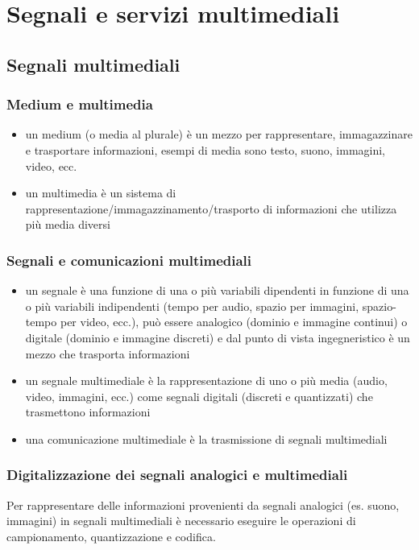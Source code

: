 \section{Segnali e servizi multimediali}
\subsection{Segnali multimediali}
\subsubsection*{Medium e multimedia}
\begin{itemize}
	\item un medium (o media al plurale) è un mezzo per rappresentare, immagazzinare e trasportare informazioni, esempi di
	media sono testo, suono, immagini, video, ecc.
	\item un multimedia è un sistema di rappresentazione/immagazzinamento/trasporto di informazioni che utilizza più media
	diversi
\end{itemize}

\subsubsection*{Segnali e comunicazioni multimediali}
\begin{itemize}
	\item un segnale è una funzione di una o più variabili dipendenti in funzione di una o più variabili indipendenti
	(tempo per audio, spazio per immagini, spazio-tempo per video, ecc.), può essere analogico (dominio e immagine
	continui) o digitale (dominio e immagine discreti) e dal punto di vista ingegneristico è un mezzo che trasporta
	informazioni
	\item un segnale multimediale è la rappresentazione di uno o più media (audio, video, immagini, ecc.)
	come segnali digitali (discreti e quantizzati) che trasmettono informazioni
	\item una comunicazione multimediale è la trasmissione di segnali multimediali
\end{itemize}

\subsubsection*{Digitalizzazione dei segnali analogici e multimediali}
Per rappresentare delle informazioni provenienti da segnali analogici (es. suono, immagini) in segnali multimediali è
necessario eseguire le operazioni di campionamento, quantizzazione e codifica.


